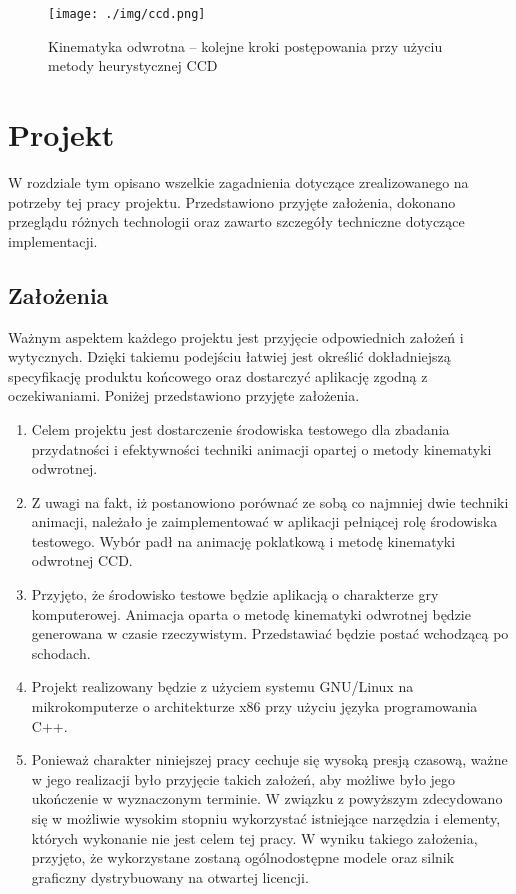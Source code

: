 \documentclass[11pt]{mwrep}
\begin{document}
  \begin{figure}
  \centering
    \texttt{[image: ./img/ccd.png]}
  \caption{Kinematyka odwrotna -- kolejne kroki postępowania przy użyciu metody heurystycznej CCD \cite{lander}}
  \label{img:ccd}
  \end{figure}


\chapter{Projekt}

W rozdziale tym opisano wszelkie zagadnienia dotyczące zrealizowanego na potrzeby tej pracy projektu. Przedstawiono przyjęte założenia, dokonano przeglądu różnych technologii oraz zawarto szczegóły techniczne dotyczące implementacji.


  \section{Założenia}

Ważnym aspektem każdego projektu jest przyjęcie odpowiednich założeń i wytycznych. Dzięki takiemu podejściu łatwiej jest określić dokładniejszą specyfikację produktu końcowego oraz dostarczyć aplikację zgodną z oczekiwaniami. Poniżej przedstawiono przyjęte założenia.


\begin{enumerate}
 \item Celem projektu jest dostarczenie środowiska testowego dla zbadania przydatności i efektywności techniki animacji opartej o metody kinematyki odwrotnej.

\item Z uwagi na fakt, iż postanowiono porównać ze sobą co najmniej dwie techniki animacji, należało je zaimplementować w aplikacji pełniącej rolę środowiska testowego. Wybór padł na animację poklatkową i metodę kinematyki odwrotnej CCD.

\item Przyjęto, że środowisko testowe będzie aplikacją o charakterze gry komputerowej. Animacja oparta o metodę kinematyki odwrotnej będzie generowana w czasie rzeczywistym. Przedstawiać będzie postać wchodzącą po schodach.

\item Projekt realizowany będzie z użyciem systemu GNU/Linux na mikrokomputerze o architekturze x86 przy użyciu języka programowania C++.

\item Ponieważ charakter niniejszej pracy cechuje się wysoką presją czasową, ważne w jego realizacji było przyjęcie takich założeń, aby możliwe było jego ukończenie w wyznaczonym terminie. W związku z powyższym zdecydowano się w możliwie wysokim stopniu wykorzystać istniejące narzędzia i elementy, których wykonanie nie jest celem tej pracy. W wyniku takiego założenia, przyjęto, że wykorzystane zostaną ogólnodostępne modele oraz silnik graficzny dystrybuowany na otwartej licencji.


\end{enumerate}
\end{document}
